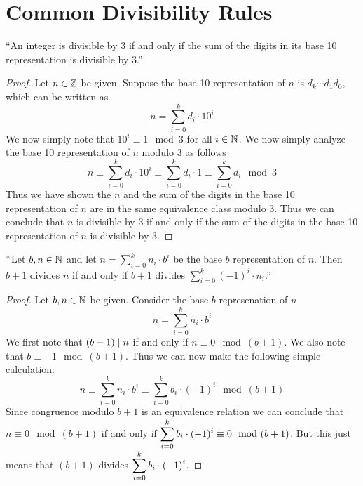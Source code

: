     \section{Common Divisibility Rules}
        \begin{theorem}
            ``An integer is divisible by $3$ if and only if the sum of the digits in its base 10
            representation is divisible by $3$.''
        \end{theorem}
        \begin{proof}
            Let $n \in \mathbb{Z}$ be given. Suppose the base 10 representation of $n$ is
            $d_k \cdots d_1 d_0$, which can be written as
            \[
                n = \sum_{i = 0}^{k} d_i \cdot 10^i
            \]
            We now simply note that $10^i \equiv 1 \mod 3$ for all $i \in \mathbb{N}$. We now simply
            analyze the base 10 representation of $n$ modulo 3 as follows
            \[
                n \equiv \sum_{i = 0}^{k} d_i \cdot 10^i \equiv \sum_{i = 0}^{k} d_i \cdot 1 \equiv \sum_{i = 0}^{k} d_i \mod 3
            \]
            Thus we have shown the $n$ and the sum of the digits in the base 10 representation of
            $n$ are in the same equivalence class modulo 3. Thus we can conclude that $n$
            is divisible by 3 if and only if the sum of the digits in the base 10 representation of $n$
            is divisible by 3. \QED
        \end{proof}
        \begin{theorem}
            $``$Let $b, n \in \mathbb{N}$ and let $n = \sum_{i = 0}^{k} n_i \cdot b^i$ be the base
            $b$ representation of $n$. Then $b + 1$ divides $n$ if and only if $b + 1$ divides
            $\sum_{i = 0}^{k} (-1)^{i} \cdot n_i$.''
        \end{theorem}
        \begin{proof}
            Let $b, n \in \mathbb{N}$ be given. Consider the base $b$ represenation of $n$
            \[
                n = \sum_{i = 0}^{k} n_i \cdot b^i
            \]
            We first note that $(b + 1) \mid n$ if and only if $n \equiv 0 \mod (b + 1)$.
            We also note that $b \equiv -1 \mod (b + 1)$. Thus we can now make the following
            simple calculation:
            \[
                n \equiv \sum_{i = 0}^{k} n_i \cdot b^i \equiv  \sum_{i = 0}^{k} b_i \cdot (-1)^i \mod (b + 1)
            \]
            Since congruence modulo $b + 1$ is an equivalence relation we can conclude that
            $n \equiv 0 \mod (b + 1)$ if and only if $\displaystyle\sum_{i = 0}^{k} b_i \cdot (-1)^i \equiv 0 \mod (b + 1)$.
            But this just means that $(b + 1)$ divides ${\displaystyle\sum_{i = 0}^{k} b_i \cdot (-1)^i}$. \QED
        \end{proof}

